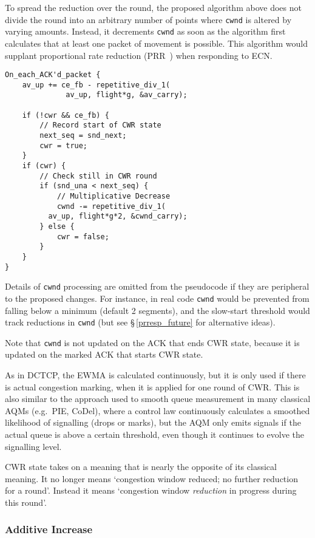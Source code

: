 To spread the reduction over the round, the proposed algorithm above does not divide the round into an arbitrary number of points where \texttt{cwnd} is altered by varying amounts. Instead, it decrements \texttt{cwnd} as soon as the algorithm first calculates that at least one packet of movement is possible. This algorithm would supplant proportional rate reduction (PRR~\cite{IETF_RFC6937:PRR}) when responding to ECN. 

\begin{verbatim}
On_each_ACK'd_packet {
    av_up += ce_fb - repetitive_div_1(
              av_up, flight*g, &av_carry);

    if (!cwr && ce_fb) {
        // Record start of CWR state
        next_seq = snd_next;
        cwr = true;
    }
    if (cwr) {
        // Check still in CWR round
        if (snd_una < next_seq) {
            // Multiplicative Decrease
            cwnd -= repetitive_div_1(
          av_up, flight*g*2, &cwnd_carry);
        } else {
            cwr = false;
        }
    }
}
\end{verbatim}

Details of \texttt{cwnd} processing are omitted from the pseudocode if they are peripheral to the proposed changes. For instance, in real code \texttt{cwnd} would be prevented from falling below a minimum (default 2 segments), and the slow-start threshold would track reductions in \texttt{cwnd} (but see \S\,\ref{prresp_future} for alternative ideas).

Note that \texttt{cwnd} is not updated on the ACK that ends CWR state, because it is updated on the marked ACK that starts CWR state.

As in DCTCP, the EWMA is calculated continuously, but it is only used if there is actual congestion marking, when it is applied for one round of CWR. This is also similar to the approach used to smooth queue measurement in many classical AQMs (e.g.\ PIE, CoDel), where a control law continuously calculates a smoothed likelihood of signalling (drops or marks), but the AQM only emits signals if the actual queue is above a certain threshold, even though it continues to evolve the signalling level.

CWR state takes on a meaning that is nearly the opposite of its classical meaning. It no longer means `congestion window reduced; no further reduction for a round'. Instead it means `congestion window \emph{reduction} in progress during this round'. 

\subsubsection{Additive Increase}\label{prresp_Additive_Increase}

